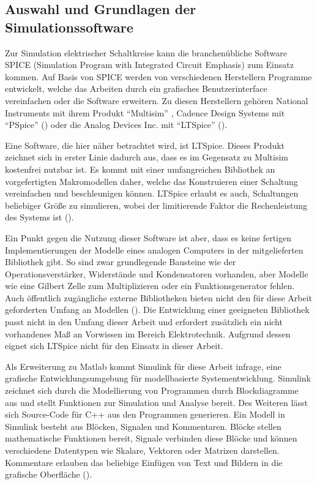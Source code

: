 \subsection{Auswahl und Grundlagen der Simulationssoftware}
\label{chap:Auswahl und Grundlagen der Simulationssoftware}

Zur Simulation elektrischer Schaltkreise kann die branchenübliche Software SPICE (Simulation Program with Integrated Circuit Emphasis) zum Einsatz kommen. Auf Basis von SPICE werden von verschiedenen Herstellern Programme entwickelt, welche das Arbeiten durch \zbol ein grafisches Benutzerinterface vereinfachen oder die Software erweitern. Zu diesen Herstellern gehören \ua National Instruments mit ihrem Produkt "`Multisim"' \cite{website:ni:multisim}, Cadence Design Systems mit "`PSpice"' (\cite{website:cadence:pspice}) oder die Analog Devices Inc. mit "`LTSpice"' (\cite{website:analogdevices:ltspice}).

Eine Software, die hier näher betrachtet wird, ist LTSpice. Dieses Produkt zeichnet sich in erster Linie dadurch aus, dass es im Gegensatz zu \zbol Multisim kostenfrei nutzbar ist. Es kommt mit einer umfangreichen Bibliothek an vorgefertigten Makromodellen daher, welche das Konstruieren einer Schaltung vereinfachen und beschleunigen können. LTSpice erlaubt es auch, Schaltungen beliebiger Größe zu simulieren, wobei der limitierende Faktor die Rechenleistung des Systems ist (\cite{Alonso2019}).

Ein Punkt gegen die Nutzung dieser Software ist aber, dass es keine fertigen Implementierungen der Modelle eines analogen Computers in der mitgelieferten Bibliothek gibt. So sind zwar grundlegende Bausteine wie der Operationsverstärker, Widerstände und Kondensatoren vorhanden, aber Modelle wie eine Gilbert Zelle zum Multiplizieren oder ein Funktionsgenerator fehlen. Auch öffentlich zugängliche externe Bibliotheken bieten nicht den für diese Arbeit geforderten Umfang an Modellen (\cite[vgl.]{website:github:ltspice-analog-computer}). Die Entwicklung einer geeigneten Bibliothek passt nicht in den Umfang dieser Arbeit und erfordert zusätzlich ein nicht vorhandenes Maß an Vorwissen im Bereich Elektrotechnik. Aufgrund dessen eignet sich LTSpice nicht für den Einsatz in dieser Arbeit.

Als Erweiterung zu Matlab kommt Simulink für diese Arbeit infrage, eine grafische Entwicklungsumgebung für modellbasierte Systementwicklung. Simulink zeichnet sich durch die Modellierung von Programmen durch Blockdiagramme aus und stellt Funktionen zur Simulation und Analyse bereit. Des Weiteren lässt sich Source-Code für \zb C++ aus den Programmen generieren. Ein Modell in Simulink besteht aus Blöcken, Signalen und Kommentaren. Blöcke stellen mathematische Funktionen bereit, Signale verbinden diese Blöcke und können verschiedene Datentypen wie Skalare, Vektoren oder Matrizen darstellen. Kommentare erlauben das beliebige Einfügen von Text und Bildern in die grafische Oberfläche (\cite{Peasley2018}).


